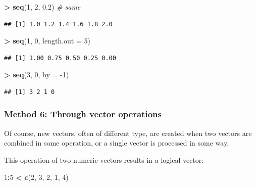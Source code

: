 \documentclass[]{book}
\newenvironment{Shaded}{\begin{snugshade}}{\end{snugshade}}
\newcommand{\CommentTok}[1]{\textcolor[rgb]{0.56,0.35,0.01}{\textit{#1}}}
\newcommand{\DataTypeTok}[1]{\textcolor[rgb]{0.13,0.29,0.53}{#1}}
\newcommand{\DecValTok}[1]{\textcolor[rgb]{0.00,0.00,0.81}{#1}}
\newcommand{\FloatTok}[1]{\textcolor[rgb]{0.00,0.00,0.81}{#1}}
\newcommand{\KeywordTok}[1]{\textcolor[rgb]{0.13,0.29,0.53}{\textbf{#1}}}
\newcommand{\NormalTok}[1]{#1}
\newcommand{\OperatorTok}[1]{\textcolor[rgb]{0.81,0.36,0.00}{\textbf{#1}}}
\newcommand{\StringTok}[1]{\textcolor[rgb]{0.31,0.60,0.02}{#1}}
\begin{document}
\begin{Shaded}
\begin{Highlighting}[]
\OperatorTok{>}\StringTok{ }\KeywordTok{seq}\NormalTok{(}\DecValTok{1}\NormalTok{, }\DecValTok{2}\NormalTok{, }\FloatTok{0.2}\NormalTok{) }\CommentTok{# same}
\end{Highlighting}
\end{Shaded}

\begin{verbatim}
## [1] 1.0 1.2 1.4 1.6 1.8 2.0
\end{verbatim}

\begin{Shaded}
\begin{Highlighting}[]
\OperatorTok{>}\StringTok{ }\KeywordTok{seq}\NormalTok{(}\DecValTok{1}\NormalTok{, }\DecValTok{0}\NormalTok{, }\DataTypeTok{length.out =} \DecValTok{5}\NormalTok{)}
\end{Highlighting}
\end{Shaded}

\begin{verbatim}
## [1] 1.00 0.75 0.50 0.25 0.00
\end{verbatim}

\begin{Shaded}
\begin{Highlighting}[]
\OperatorTok{>}\StringTok{ }\KeywordTok{seq}\NormalTok{(}\DecValTok{3}\NormalTok{, }\DecValTok{0}\NormalTok{, }\DataTypeTok{by =} \DecValTok{-1}\NormalTok{)}
\end{Highlighting}
\end{Shaded}

\begin{verbatim}
## [1] 3 2 1 0
\end{verbatim}

\hypertarget{method-6-through-vector-operations}{%
\subsubsection*{Method 6: Through vector operations}\label{method-6-through-vector-operations}}

Of course, new vectors, often of different type, are created when two vectors are combined in some operation, or a single vector is processed in some way.

This operation of two numeric vectors results in a logical vector:

\begin{Shaded}
\begin{Highlighting}[]
\DecValTok{1}\OperatorTok{:}\DecValTok{5} \OperatorTok{<}\StringTok{ }\KeywordTok{c}\NormalTok{(}\DecValTok{2}\NormalTok{, }\DecValTok{3}\NormalTok{, }\DecValTok{2}\NormalTok{, }\DecValTok{1}\NormalTok{, }\DecValTok{4}\NormalTok{)}
\end{Highlighting}
\end{Shaded}
\end{document}
